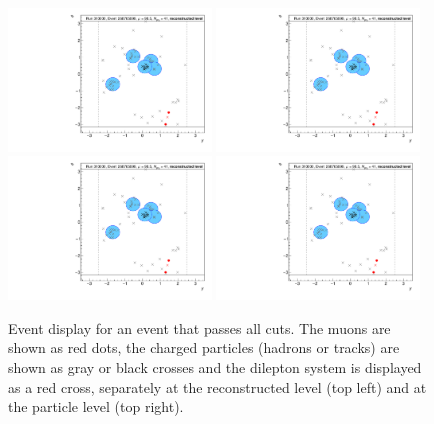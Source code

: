 \begin{figure}[h!]
  \centering
  \includegraphics[page=26,width=0.48\textwidth]{figures/EventDisplays.pdf}
  \includegraphics[page=27,width=0.48\textwidth]{figures/EventDisplays.pdf} \\
  \includegraphics[page=29,width=0.48\textwidth]{figures/EventDisplays.pdf}
  \includegraphics[page=30,width=0.48\textwidth]{figures/EventDisplays.pdf}
  \caption{Event display for an event that passes all cuts. 
    The muons are shown as red dots, the charged particles (hadrons or tracks) are shown as gray or black crosses and the dilepton system is displayed as a red cross, separately at the reconstructed level (top left) and at the particle level (top right). 
}
\end{figure}
